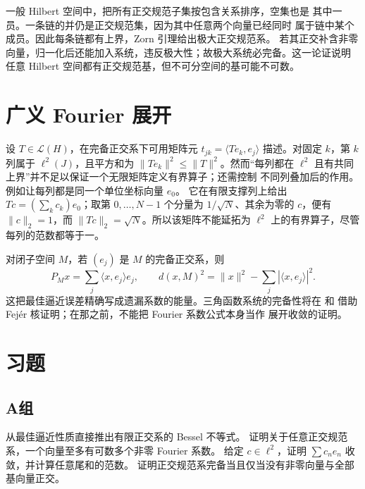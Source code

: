 一般 Hilbert 空间中，把所有正交规范子集按包含关系排序，空集也是
其中一员。一条链的并仍是正交规范集，因为其中任意两个向量已经同时
属于链中某个成员。因此每条链都有上界，Zorn 引理给出极大正交规范系。
若其正交补含非零
向量，归一化后还能加入系统，违反极大性；故极大系统必完备。这一论证说明
任意 Hilbert 空间都有正交规范基，但不可分空间的基可能不可数。

\section{广义 Fourier 展开}

设 \(T\in\mathcal L(H)\)，在完备正交系下可用矩阵元
\(t_{jk}=\langle Te_k,e_j\rangle\) 描述。对固定 \(k\)，第 \(k\) 列属于
\(\ell^2(J)\)，且平方和为 \(\|Te_k\|^2\le\|T\|^2\)。然而“每列都在
\(\ell^2\) 且有共同上界”并不足以保证一个无限矩阵定义有界算子；还需控制
不同列叠加后的作用。例如让每列都是同一个单位坐标向量 \(e_0\)。
它在有限支撑列上给出 \(Tc=(\sum_k c_k)e_0\)；取第 \(0,\ldots,N-1\)
个分量为 \(1/\sqrt N\)、其余为零的 \(c\)，便有
\(\|c\|_2=1\)，而 \(\|Tc\|_2=\sqrt N\)。所以该矩阵不能延拓为
\(\ell^2\) 上的有界算子，尽管每列的范数都等于一。

对闭子空间 \(M\)，若 \((e_j)\) 是 \(M\) 的完备正交系，则
\[
 P_Mx=\sum_j\langle x,e_j\rangle e_j,
 \qquad d(x,M)^2=\|x\|^2-\sum_j|\langle x,e_j\rangle|^2.
\]
这把最佳逼近误差精确写成遗漏系数的能量。三角函数系统的完备性将在
和
借助 Fejér 核证明；在那之前，不能把 Fourier 系数公式本身当作
展开收敛的证明。

\section*{习题}
\subsection*{A组}
\begin{enumerate}[label=\textbf{\thechapter.\arabic*.}]
从最佳逼近性质直接推出有限正交系的 Bessel 不等式。
证明关于任意正交规范系，一个向量至多有可数多个非零 Fourier 系数。
给定 \(c\in\ell^2\)，证明 \(\sum c_ne_n\) 收敛，并计算任意尾和的范数。
证明正交规范系完备当且仅当没有非零向量与全部基向量正交。
\end{enumerate}
